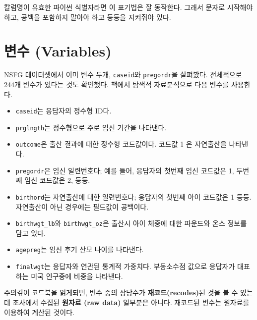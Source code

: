 칼럼명이 유효한 파이썬 식별자라면 이 표기법은 잘 동작한다. 그래서 문자로 시작해야 하고, 공백을 포함하지 말아야 하고 등등을 지켜줘야 있다.  
\section{변수 (Variables)}

NSFG 데이터셋에서 이미 변수 두개, {\tt caseid}와 {\tt pregordr}을 살펴봤다. 전체적으로 244개 변수가 있다는 것도 확인했다. 책에서 탐색적 자료분석으로 다음 변수를 사용한다.

\begin{itemize}

\item {\tt caseid}는 응답자의 정수형 ID다.

\item {\tt prglngth}는 정수형으로 주로 임신 기간을 나타낸다.

\item {\tt outcome}은 출산 결과에 대한 정수형 코드값이다. 코드값 1 은 자연출산을 나타낸다.

\item {\tt pregordr}은 임신 일련번호다; 예를 들어, 응답자의 첫번째 임신 코드값은 1, 두번째 임신 코드값은 2, 등등.

\item {\tt birthord}는 자연출산에 대한 일련번호다; 응답자의 첫번째 아이 코드값은 1 등등. 자연출산이 아닌 경우에는 필드값이 공백이다. 


\item \verb"birthwgt_lb"와 \verb"birthwgt_oz"은 출산시 아이 체중에 대한 파운드와 온스 정보를 담고 있다.


\item {\tt agepreg}는 임신 후기 산모 나이를 나타낸다.

\item {\tt finalwgt}는 응답자와 연관된 통계적 가중치다. 부동소수점 값으로 응답자가 대표하는 미국 인구중에 비중을 나타낸다.


\end{itemize}

주의깊이 코드북을 읽게되면, 변수 중의 상당수가 {\bf 재코드(recodes)}된 것을 볼 수 있는데 조사에서 수집된 {\bf 원자료 (raw data)} 일부분은 아니다. 재코드된 변수는 원자료를 이용하여 계산된 것이다.

